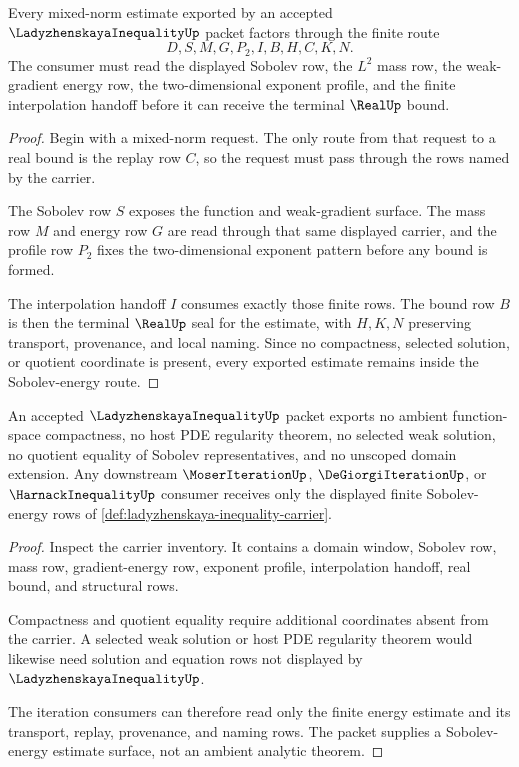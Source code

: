 \begin{theorem}
\label{thm:ladyzhenskaya-inequality-sobolev-energy-route}
Every mixed-norm estimate exported by an accepted $\LadyzhenskayaInequalityUp$ packet factors through the finite route
$$
D,S,M,G,P_2,I,B,H,C,K,N.
$$
The consumer must read the displayed Sobolev row, the $L^2$ mass row, the weak-gradient energy row, the two-dimensional exponent profile, and the finite interpolation handoff before it can receive the terminal $\RealUp$ bound.
\end{theorem}
\begin{proof}
Begin with a mixed-norm request. The only route from that request to a real bound is the replay row $C$, so the request must pass through the rows named by the carrier.

The Sobolev row $S$ exposes the function and weak-gradient surface. The mass row $M$ and energy row $G$ are read through that same displayed carrier, and the profile row $P_2$ fixes the two-dimensional exponent pattern before any bound is formed.

The interpolation handoff $I$ consumes exactly those finite rows. The bound row $B$ is then the terminal $\RealUp$ seal for the estimate, with $H,K,N$ preserving transport, provenance, and local naming. Since no compactness, selected solution, or quotient coordinate is present, every exported estimate remains inside the Sobolev-energy route.
\end{proof}

\begin{theorem}
\label{thm:ladyzhenskaya-inequality-nonescape}
An accepted $\LadyzhenskayaInequalityUp$ packet exports no ambient function-space compactness, no host PDE regularity theorem, no selected weak solution, no quotient equality of Sobolev representatives, and no unscoped domain extension. Any downstream $\MoserIterationUp$, $\DeGiorgiIterationUp$, or $\HarnackInequalityUp$ consumer receives only the displayed finite Sobolev-energy rows of \autoref{def:ladyzhenskaya-inequality-carrier}.
\end{theorem}
\begin{proof}
Inspect the carrier inventory. It contains a domain window, Sobolev row, mass row, gradient-energy row, exponent profile, interpolation handoff, real bound, and structural rows.

Compactness and quotient equality require additional coordinates absent from the carrier. A selected weak solution or host PDE regularity theorem would likewise need solution and equation rows not displayed by $\LadyzhenskayaInequalityUp$.

The iteration consumers can therefore read only the finite energy estimate and its transport, replay, provenance, and naming rows. The packet supplies a Sobolev-energy estimate surface, not an ambient analytic theorem.
\end{proof}

